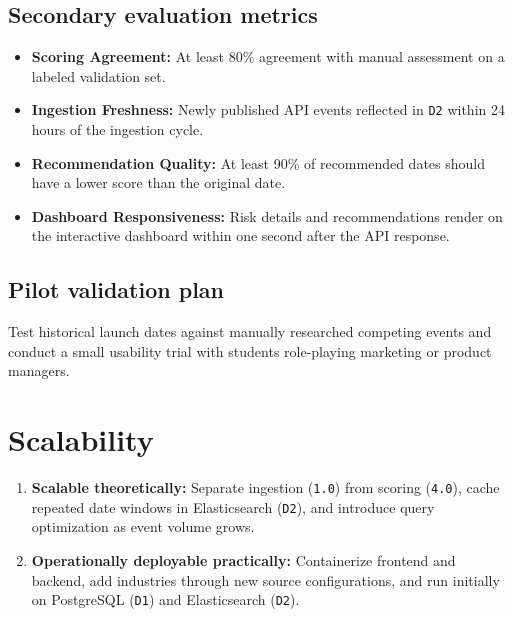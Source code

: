 \documentclass[12pt]{article}
\begin{document}
\subsection{Secondary evaluation metrics}
\begin{itemize}[leftmargin=0.7cm]
\item \textbf{Scoring Agreement:} At least 80\% agreement with manual assessment on a labeled validation set.
\item \textbf{Ingestion Freshness:} Newly published API events reflected in \texttt{D2} within 24 hours of the ingestion cycle.
\item \textbf{Recommendation Quality:} At least 90\% of recommended dates should have a lower score than the original date.
\item \textbf{Dashboard Responsiveness:} Risk details and recommendations render on the interactive dashboard within one second after the API response.
\end{itemize}

\subsection{Pilot validation plan}
Test historical launch dates against manually researched competing events and conduct a small usability trial with students role-playing marketing or product managers.

\section{Scalability}
\begin{enumerate}[leftmargin=0.7cm]
\item \textbf{Scalable theoretically:} Separate ingestion (\texttt{1.0}) from scoring (\texttt{4.0}), cache repeated date windows in Elasticsearch (\texttt{D2}), and introduce query optimization as event volume grows.
\item \textbf{Operationally deployable practically:} Containerize frontend and backend, add industries through new source configurations, and run initially on PostgreSQL (\texttt{D1}) and Elasticsearch (\texttt{D2}).
\end{enumerate}
\end{document}
